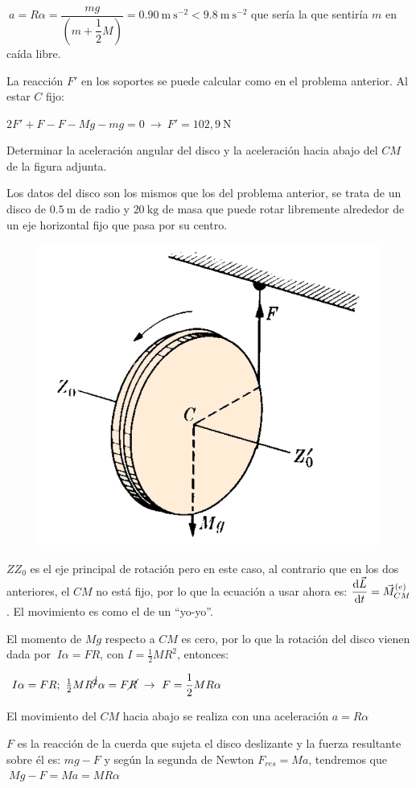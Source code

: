 $\ a=R\alpha=\dfrac{mg}{\left( m+\dfrac 1 2 M \right)}=0.90 \ \mathrm{m\ s}^{-2} < 9.8 \ \mathrm{m\ s}^{-2}$ que sería la que sentiría $m$ en caída libre.

La reacción $F'$ en los soportes se puede calcular como en el problema anterior. Al estar $C$ fijo:

$2F'+F-F-Mg-mg=0 \ \to \ F'=102,9\ \mathrm{N}$

\begin{prob}
\begin{multicols}{2}
Determinar la aceleración angular del disco y la aceleración hacia abajo del $CM$ de la figura adjunta.

Los datos del disco son los mismos que los del problema anterior, se trata de un disco de $0.5\ \mathrm{m}$  de radio y $20\ \mathrm{kg}$ de masa	que puede rotar libremente alrededor de un eje horizontal fijo que pasa por su centro.
\begin{figure}[H]
	\centering
	\includegraphics[width=.5\textwidth]{imagenes/imagenes16/T16IM13.png}
\end{figure}	
\end{multicols}
\end{prob}

$ZZ_0$ es el eje principal de rotación pero en este caso, al contrario que en los dos anteriores, el $CM$ no está fijo, por lo que la ecuación a usar ahora es:
$\displaystyle \dv{\vec L}{t}=\vec M^{(e)}_{CM}$. 
El movimiento es como el de un ``yo-yo''.

El momento de $Mg$ respecto a $CM$ es cero, por lo que la rotación del disco vienen dada por $\ I\alpha=FR$, con $I=\frac 1 2 MR^2$, entonces:

$\ I\alpha=FR; \ \frac 1 2 M R^{\cancel{2}} \alpha=F\cancel{R} \ \to \ F=\dfrac 1 2 M R \alpha$

El movimiento del $CM$ hacia abajo se realiza con una aceleración $a=R\alpha$

$F$ es la reacción de la cuerda que sujeta el disco deslizante y la fuerza resultante sobre él es: $mg-F$ y según la segunda de Newton $F_{res}=Ma$, tendremos que $\ Mg-F=Ma=MR\alpha$

